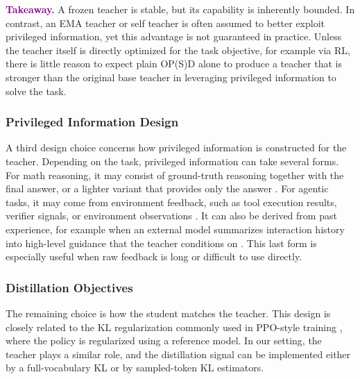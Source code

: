 \noindent\textcolor{purple}{\textbf{Takeaway.}} A frozen teacher is stable, but its capability is inherently bounded. In contrast, an EMA teacher or self teacher is often assumed to better exploit privileged information, yet this advantage is not guaranteed in practice. Unless the teacher itself is directly optimized for the task objective, for example via RL, there is little reason to expect plain OP(S)D alone to produce a teacher that is stronger than the original base teacher in leveraging privileged information to solve the task.





\subsubsection{Privileged Information Design}
A third design choice concerns how privileged information is constructed for the teacher. Depending on the task, privileged information can take several forms. For math reasoning, it may consist of ground-truth reasoning together with the final answer, or a lighter variant that provides only the answer \cite{zhao2026selfdistilledreasoneronpolicyselfdistillation}. For agentic tasks, it may come from environment feedback, such as tool execution results, verifier signals, or environment observations \cite{hubotter2026reinforcementlearningselfdistillation}. It can also be derived from past experience, for example when an external model summarizes interaction history into high-level guidance that the teacher conditions on \cite{wang2026openclawrltrainagentsimply,ye2026onpolicycontextdistillationlanguage}. This last form is especially useful when raw feedback is long or difficult to use directly.




\subsubsection{Distillation Objectives}

The remaining choice is how the student matches the teacher. This design is closely related to the KL regularization commonly used in PPO-style training \cite{schulman2017proximalpolicyoptimizationalgorithms}, where the policy is regularized using a reference model. In our setting, the teacher plays a similar role, and the distillation signal can be implemented either by a full-vocabulary KL or by sampled-token KL estimators.





